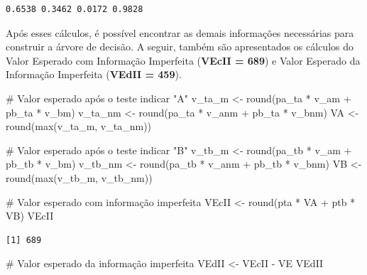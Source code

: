 \documentclass[
  letterpaper,
  DIV=11,
  numbers=noendperiod]{scrartcl}
\newenvironment{Shaded}{\begin{snugshade}}{\end{snugshade}}
\newcommand{\CommentTok}[1]{\textcolor[rgb]{0.37,0.37,0.37}{#1}}
\newcommand{\FunctionTok}[1]{\textcolor[rgb]{0.28,0.35,0.67}{#1}}
\newcommand{\NormalTok}[1]{\textcolor[rgb]{0.00,0.23,0.31}{#1}}
\newcommand{\OtherTok}[1]{\textcolor[rgb]{0.00,0.23,0.31}{#1}}
\newcommand{\SpecialCharTok}[1]{\textcolor[rgb]{0.37,0.37,0.37}{#1}}
\begin{document}
\begin{verbatim}
0.6538 0.3462 0.0172 0.9828
\end{verbatim}

Após esses cálculos, é possível encontrar as demais informações
necessárias para construir a árvore de decisão. A seguir, também são
apresentados os cálculos do Valor Esperado com Informação Imperfeita
(\textbf{VEcII = 689}) e Valor Esperado da Informação Imperfeita
(\textbf{VEdII = 459}).

\begin{Shaded}
\begin{Highlighting}[]
\CommentTok{\# Valor esperado após o teste indicar "A" }
\NormalTok{v\_ta\_m  }\OtherTok{\textless{}{-}}  \FunctionTok{round}\NormalTok{(pa\_ta }\SpecialCharTok{*}\NormalTok{ v\_am }\SpecialCharTok{+}\NormalTok{ pb\_ta }\SpecialCharTok{*}\NormalTok{ v\_bm)}
\NormalTok{v\_ta\_nm }\OtherTok{\textless{}{-}}  \FunctionTok{round}\NormalTok{(pa\_ta }\SpecialCharTok{*}\NormalTok{ v\_anm }\SpecialCharTok{+}\NormalTok{ pb\_ta }\SpecialCharTok{*}\NormalTok{ v\_bnm)}
\NormalTok{VA      }\OtherTok{\textless{}{-}}  \FunctionTok{round}\NormalTok{(}\FunctionTok{max}\NormalTok{(v\_ta\_m, v\_ta\_nm))}

\CommentTok{\# Valor esperado após o teste indicar "B" }
\NormalTok{v\_tb\_m }\OtherTok{\textless{}{-}}   \FunctionTok{round}\NormalTok{(pa\_tb }\SpecialCharTok{*}\NormalTok{ v\_am }\SpecialCharTok{+}\NormalTok{ pb\_tb }\SpecialCharTok{*}\NormalTok{ v\_bm)}
\NormalTok{v\_tb\_nm }\OtherTok{\textless{}{-}}  \FunctionTok{round}\NormalTok{(pa\_tb }\SpecialCharTok{*}\NormalTok{ v\_anm }\SpecialCharTok{+}\NormalTok{ pb\_tb }\SpecialCharTok{*}\NormalTok{ v\_bnm)}
\NormalTok{VB }\OtherTok{\textless{}{-}} \FunctionTok{round}\NormalTok{(}\FunctionTok{max}\NormalTok{(v\_tb\_m, v\_tb\_nm))}

\CommentTok{\# Valor esperado com informação imperfeita}
\NormalTok{VEcII }\OtherTok{\textless{}{-}} \FunctionTok{round}\NormalTok{(pta }\SpecialCharTok{*}\NormalTok{ VA }\SpecialCharTok{+}\NormalTok{ ptb }\SpecialCharTok{*}\NormalTok{ VB)}
\NormalTok{VEcII}
\end{Highlighting}
\end{Shaded}

\begin{verbatim}
[1] 689
\end{verbatim}

\begin{Shaded}
\begin{Highlighting}[]
\CommentTok{\# Valor esperado da informação imperfeita}
\NormalTok{VEdII }\OtherTok{\textless{}{-}}\NormalTok{ VEcII }\SpecialCharTok{{-}}\NormalTok{ VE}
\NormalTok{VEdII}
\end{Highlighting}
\end{Shaded}
\end{document}
